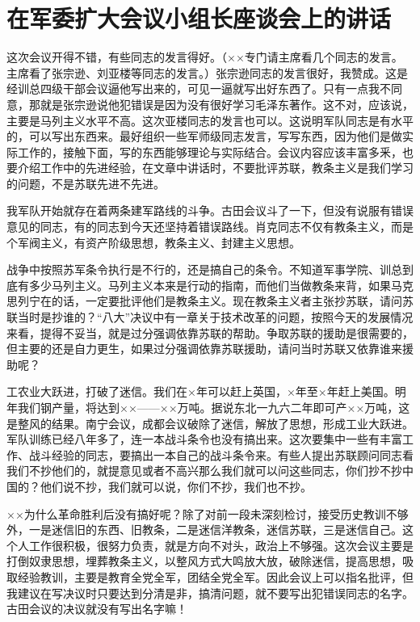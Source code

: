 \section[在军委扩大会议小组长座谈会上的讲话（一九五八年六月二十八日）]{在军委扩大会议小组长座谈会上的讲话}


这次会议开得不错，有些同志的发言得好。（××专门请主席看几个同志的发言。主席看了张宗逊、刘亚楼等同志的发言。）张宗逊同志的发言很好，我赞成。这是经训总四级干部会议逼他写出来的，可见一逼就写出好东西了。只有一点我不同意，那就是张宗逊说他犯错误是因为没有很好学习毛泽东著作。这不对，应该说，主要是马列主义水平不高。这次亚楼同志的发言也可以。这说明军队同志是有水平的，可以写出东西来。最好组织一些军师级同志发言，写写东西，因为他们是做实际工作的，接触下面，写的东西能够理论与实际结合。会议内容应该丰富多釆，也要介绍工作中的先进经验，在文章中讲话时，不要批评苏联，教条主义是我们学习的问题，不是苏联先进不先进。

我军队开始就存在着两条建军路线的斗争。古田会议斗了一下，但没有说服有错误意见的同志，有的同志到今天还坚持着错误路线。肖克同志不仅有教条主义，而是个军阀主义，有资产阶级思想，教条主义、封建主义思想。

战争中按照苏军条令执行是不行的，还是搞自己的条令。不知道军事学院、训总到底有多少马列主义。马列主义本来是行动的指南，而他们当做教条来背，如果马克思列宁在的话，一定要批评他们是教条主义。现在教条主义者主张抄苏联，请问苏联当时是抄谁的？“八大”决议中有一章关于技术改革的问题，按照今天的发展情况来看，提得不妥当，就是过分强调依靠苏联的帮助。争取苏联的援助是很需要的，但主要的还是自力更生，如果过分强调依靠苏联援助，请问当时苏联又依靠谁来援助呢？

工农业大跃进，打破了迷信。我们在×年可以赶上英国，×年至×年赶上美国。明年我们钢产量，将达到××——××万吨。据说东北一九六二年即可产××万吨，这是整风的结果。南宁会议，成都会议破除了迷信，解放了思想，形成工业大跃进。军队训练已经八年多了，连一本战斗条令也没有搞出来。这次要集中一些有丰富工作、战斗经验的同志，要搞出一本自己的战斗条令来。有些人提出苏联顾问同志看我们不抄他们的，就提意见或者不高兴那么我们就可以问这些同志，你们抄不抄中国的？他们说不抄，我们就可以说，你们不抄，我们也不抄。

××为什么革命胜利后没有搞好呢？除了对前一段未深刻检讨，接受历史教训不够外，一是迷信旧的东西、旧教条，二是迷信洋教条，迷信苏联，三是迷信自己。这个人工作很积极，很努力负责，就是方向不对头，政治上不够强。这次会议主要是打倒奴隶思想，埋葬教条主义，以整风方式大鸣放大放，破除迷信，提高思想，吸取经验教训，主要是教育全党全军，团结全党全军。因此会议上可以指名批评，但我建议在写决议时只要达到分清是非，搞清问题，就不要写出犯错误同志的名字。古田会议的决议就没有写出名字嘛！

